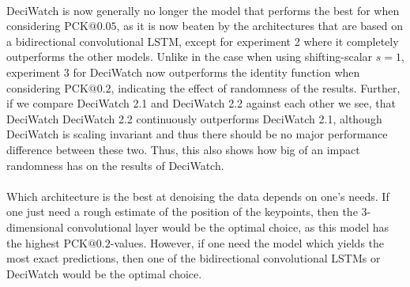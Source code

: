 \documentclass[./main.tex]{subfiles}
\begin{document}
\\
DeciWatch is now generally no longer the model that performs the best for when considering PCK$@0.05$, as it is now beaten by the architectures that are based on a bidirectional convolutional LSTM, except for experiment 2 where it completely outperforms the other models. Unlike in the case when using shifting-scalar $s = 1$, experiment 3 for DeciWatch now outperforms the identity function when considering PCK$@0.2$, indicating the effect of randomness of the results. Further, if we compare DeciWatch 2.1 and DeciWatch 2.2 against each other we see, that DeciWatch DeciWatch 2.2 continuously outperforms DeciWatch 2.1, although DeciWatch is scaling invariant and thus there should be no major performance difference between these two. Thus, this also shows how big of an impact randomness has on the results of DeciWatch.
\\
\\
Which architecture is the best at denoising the data depends on one's needs. If one just need a rough estimate of the position of the keypoints, then the 3-dimensional convolutional layer would be the optimal choice, as this model has the highest PCK$@0.2$-values. However, if one need the model which yields the most exact predictions, then one of the bidirectional convolutional LSTMs or DeciWatch would be the optimal choice.
\end{document}
